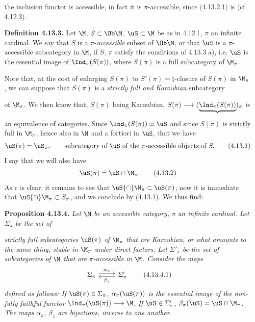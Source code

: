  the inclusion functor is accessible, in fact it is $\pi$-accessible, since (4.13.2.1) is (cf. 4.12.3).

\textbf{Definition 4.13.3.} Let $\M$, $S \subset \Ob\M$, $\uS \subset \M$ be as in 4.12.1, $\pi$ an infinite cardinal. We say that $S$ is a $\pi$-\textit{accessible} subset of $\Ob\M$, or that $\uS$ is a $\pi$-accessible subcategory in $\M$, if $S$, $\pi$ satisfy the conditions of 4.13.3 a), i.e. $\uS$ is the essential image %
of $\Ind_\pi(S(\pi))$, where $S(\pi)$ is a full subcategory of $\M_\pi$.

Note that, at the cost of enlarging $S(\pi)$ to $S'(\pi) = {\natural}$-closure of $S(\pi)$ in $\M_\pi$, we can suppose that $S(\pi)$ is a \textit{strictly full and Karoubian} subcategory

of $\M_\pi$. We then know that, $S(\pi)$ being Karoubian, $S(\pi) \longrightarrow (\underbrace{\Ind_\pi(S(\pi))}_{})_\pi$ is an equivalence of categories. Since $\Ind_\pi(S(\pi)) \simeq \uS$ and since $S(\pi)$ is strictly full in $\M_\pi$, hence also in $\M$ and a fortiori in $\uS$, that we have
\[
\uS(\pi) = \uS_\pi , \qquad \text{subcategory of } \uS \text{ of the } \pi\text{-accessible objects of } S. \tag*{(4.13.1)}
\]
I say that we will also have
\[
\uS(\pi) = \uS \cap \M_\pi . \tag*{(4.13.2)}
\]
As c is clear, it remains to see that $\uS{\cap}\M_\pi \subset \uS(\pi)$, now it is immediate that $\uS{\cap}\M_\pi \subset S_\pi$, %
and we conclude by (4.13.1). We thus find:

\textbf{Proposition 4.13.4.} \textit{Let $\M$ be an accessible category, $\pi$ an infinite cardinal. Let $\Sigma_\pi$ be the set of}

\textit{strictly full subcategories $\uS(\pi)$ of $\M_\pi$ that are Karoubian, or what amounts to the same thing, stable in $\M_\pi$ under direct factors. Let $\Sigma'_\pi$ be the set of subcategories of}
\textit{$\M$ that are $\pi$-accessible in $\M$. Consider the maps}
\[
\begin{tikzcd}
\Sigma_\pi \arrow[r, shift left, "\alpha_\pi"] & \Sigma'_\pi \arrow[l, shift left, "\beta_\pi"]
\end{tikzcd}
\tag*{(4.13.4.1)}
\]
\textit{defined as follows: If $\uS(\pi) \in \Sigma_\pi$, $\alpha_\pi(\uS(\pi))$ is the essential image of the non-fully faithful functor} $\Ind_\pi(\uS(\pi)) \longrightarrow \M$. \textit{If $\uS \in \Sigma'_\pi$, $\beta_\pi(\uS) = \uS \cap \M_\pi$. The maps $\alpha_\pi$, $\beta_\pi$ are bijections, inverse to one another.}


